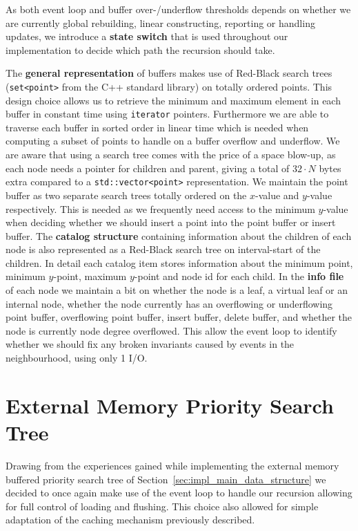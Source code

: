 \documentclass[twoside,11pt,openright]{report}
\begin{document}
As both event loop and buffer over-/underflow thresholds depends on whether we are currently global rebuilding, linear constructing, reporting or handling updates, we introduce a \textbf{state switch} that is used throughout our implementation to decide which path the recursion should take.

The \textbf{general representation} of buffers makes use of Red-Black search trees (\texttt{set<point>} from the C++ standard library) on totally ordered points. This design choice allows us to retrieve the minimum and maximum element in each buffer in constant time using \texttt{iterator} pointers. Furthermore we are able to traverse each buffer in sorted order in linear time which is needed when computing a subset of points to handle on a buffer overflow and underflow. We are aware that using a search tree comes with the price of a space blow-up, as each node needs a pointer for children and parent, giving a total of $32 \cdot N$ bytes extra compared to a \texttt{std::vector<point>} representation. We maintain the point buffer as two separate search trees totally ordered on the $x$-value and $y$-value respectively. This is needed as we frequently need access to the minimum $y$-value when deciding whether we should insert a point into the point buffer or insert buffer. The \textbf{catalog structure} containing information about the children of each node is also represented as a Red-Black search tree on interval-start of the children. In detail each catalog item stores information about the minimum point, minimum $y$-point, maximum $y$-point and node id for each child. In the \textbf{info file} of each node we maintain a bit on whether the node is a leaf, a virtual leaf or an internal node, whether the node currently has an overflowing or underflowing point buffer, overflowing point buffer, insert buffer, delete buffer, and whether the node is currently node degree overflowed. This allow the event loop to identify whether we should fix any broken invariants caused by events in the neighbourhood, using only 1 I/O.

\section{External Memory Priority Search Tree}
Drawing from the experiences gained while implementing the external memory buffered priority search tree of Section~\ref{sec:impl_main_data_structure} we decided to once again make use of the event loop to handle our recursion allowing for full control of loading and flushing. This choice also allowed for simple adaptation of the caching mechanism previously described.
\end{document}
